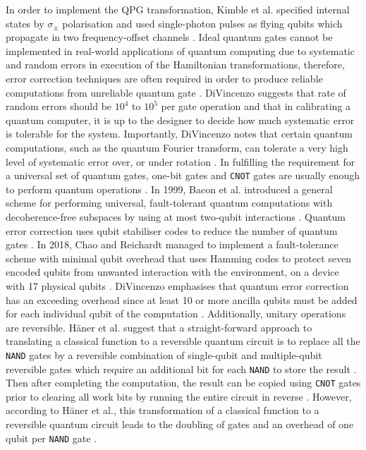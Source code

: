 In order to implement the QPG transformation, Kimble et al. specified internal states by $\sigma_\pm$ polarisation and used single-photon pulses as flying qubits which propagate in two frequency-offset channels \cite{turchette1995measurement}. Ideal quantum gates cannot be implemented in real-world applications of quantum computing due to systematic and random errors in execution of the Hamiltonian transformations, therefore, error correction techniques are often required in order to produce reliable computations from unreliable quantum gate \cite{divincenzo2000physical}. DiVincenzo suggests that rate of random errors should be $10^4$ to $10^5$ per gate operation \cite{divincenzo2000physical} and that in calibrating a quantum computer, it is up to the designer to decide how much systematic error is tolerable for the system. Importantly, DiVincenzo notes that certain quantum computations, such as the quantum Fourier transform, can tolerate a very high level of systematic error over, or under rotation \cite{divincenzo2000physical}. In fulfilling the requirement for a universal set of quantum gates, one-bit gates and \texttt{CNOT} gates are usually enough to perform quantum operations \cite{divincenzo2000physical}. In 1999, Bacon et al. introduced a general scheme for performing universal, fault-tolerant quantum computations with decoherence-free subspaces by using at most two-qubit interactions \cite{bacon2000universal}. Quantum error correction uses qubit stabiliser codes to reduce the number of quantum gates \cite{chao2018quantum}. In 2018, Chao and Reichardt managed to implement a fault-tolerance scheme with minimal qubit overhead that uses Hamming codes to protect seven encoded qubits from unwanted interaction with the environment, on a device with 17 physical qubits \cite{chao2018quantum}. DiVincenzo emphasises that quantum error correction has an exceeding overhead since at least 10 or more \gls{ancilla} qubits must be added for each individual qubit of the computation \cite{divincenzo2000physical}. Additionally, unitary operations are reversible. H\"{a}ner et al. suggest that a straight-forward approach to translating a classical function to a reversible quantum circuit is to replace all the \texttt{NAND} gates by a reversible combination of single-qubit and multiple-qubit reversible gates which require an additional bit for each \texttt{NAND} to store the result \cite{haner2016high}. Then after completing the computation, the result can be copied using \texttt{CNOT} gates prior to clearing all work bits by running the entire circuit in reverse \cite{haner2016high}. However, according to H\"{a}ner et al., this transformation of a classical function to a reversible quantum circuit leads to the doubling of gates and an overhead of one qubit per \texttt{NAND} gate \cite{haner2016high}. 


